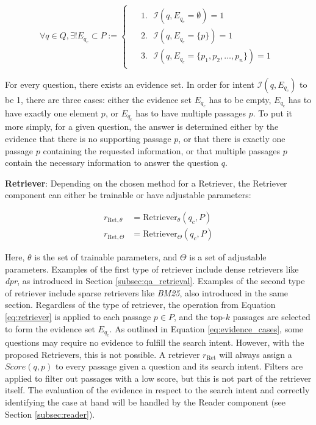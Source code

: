 \begin{equation}
    \forall q \in Q, \exists! E_{q_c} \subset P  := 
    \begin{cases}
        \begin{aligned}
            &1. \text{ } \mathcal{I}(q,E_{q_c} = \emptyset) = 1 \\
            &2. \text{ } \mathcal{I}(q,E_{q_c} = \{p\}) = 1 \\
            &3. \text{ } \mathcal{I}(q,E_{q_c} = \{p_1, p_2, \dots, p_n\}) = 1
        \end{aligned}
    \end{cases}
    \label{eq:evidence_cases}
\end{equation}

For every question, there exists an evidence set. In order for intent $\mathcal{I}(q,E_{q_c})$ to be 1, there are three cases: either the evidence set $E_{q_c}$ has to be empty, $E_{q_c}$ has to have exactly one element $p$, or $E_{q_c}$ has to have multiple passages $p$. To put it more simply, for a given question, the answer is determined either by the evidence that there is no supporting passage $p$, or that there is exactly one passage $p$ containing the requested information, or that multiple passages $p$ contain the necessary information to answer the question $q$.

\vspace{\baselineskip}

\textbf{Retriever}: Depending on the chosen method for a Retriever, the Retriever component can either be trainable or have adjustable parameters:

\begin{align}
    r_{\text{Ret}, \theta} &= \text{Retriever}_\theta(q_c, P) \\
    r_{\text{Ret}, \Theta} &= \text{Retriever}_\Theta(q_c, P)
\end{align}

Here, $\theta$ is the set of trainable parameters, and $\Theta$ is a set of adjustable parameters. Examples of the first type of retriever include dense retrievers like \textit{\gls{dpr}}, as introduced in Section \ref{subsec:qa_retrieval}. Examples of the second type of retriever include sparse retrievers like \textit{BM25}, also introduced in the same section. Regardless of the type of retriever, the operation from Equation \ref{eq:retriever} is applied to each passage $p \in P$, and the top-$k$ passages are selected to form the evidence set $E_{q_c}$. As outlined in Equation \ref{eq:evidence_cases}, some questions may require no evidence to fulfill the search intent. However, with the proposed Retrievers, this is not possible. A retriever $r_{\text{Ret}}$ will always assign a $Score(q,p)$ to every passage given a question and its search intent. Filters are applied to filter out passages with a low score, but this is not part of the retriever itself. The evaluation of the evidence in respect to the search intent and correctly identifying the case at hand will be handled by the Reader component (see Section \ref{subsec:reader}).

